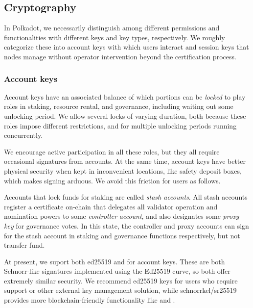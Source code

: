 \subsection{Cryptography}\label{sec:crypto}

In Polkadot, we necessarily distinguish among different permissions and functionalities with different keys and key types, respectively.  We roughly categorize these into account keys with which users interact and session keys that nodes manage without operator intervention beyond the certification process.

\subsubsection{Account keys}

Account keys have an associated balance of which portions can be {\em locked} to play roles in staking, resource rental, and governance, including waiting out some unlocking period.  We allow several locks of varying duration, both because these roles impose different restrictions, and for multiple unlocking periods running concurrently. 

We encourage active participation in all these roles, but they all require occasional signatures from accounts.  At the same time, account keys have better physical security when kept in inconvenient locations, like safety deposit boxes, which makes signing arduous.  We avoid this friction for users as follows.

Accounts that lock funds for staking are called {\em stash accounts}.  All stash accounts register a certificate on-chain that delegates all validator operation and nomination powers to some {\em controller account}, and also designates some {\em proxy key} for governance votes.  In this state, the controller and proxy accounts can sign for the stash account in staking and governance functions respectively, but not transfer fund.  

\smallskip

At present, we suport both ed25519 and  for account keys.  These are both Schnorr-like signatures implemented using the Ed25519 curve, so both offer extremely similar security.  We recommend ed25519 keys for users who require  support or other external key management solution, while schnorrkel/sr25519 provides more blockchain-friendly functionality like  and .  


